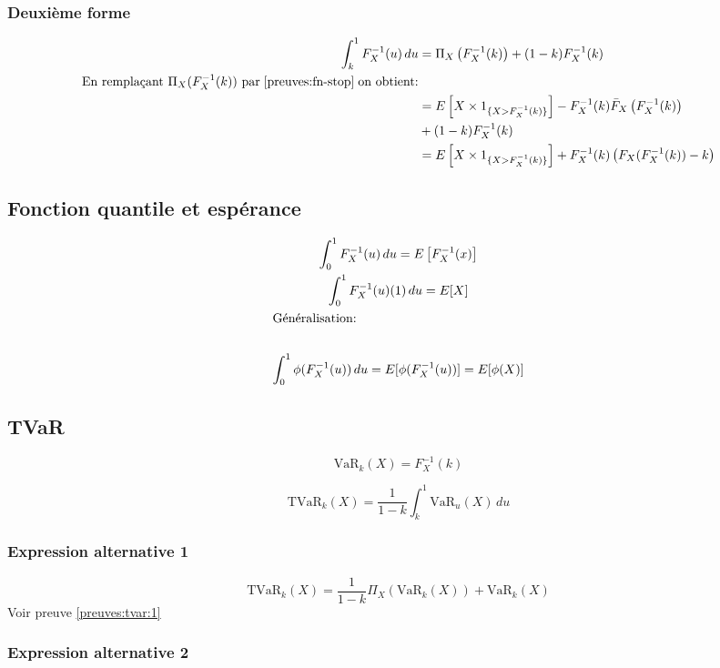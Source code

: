 \subsubsection*{Deuxième forme}\label{intro:fn-quantile:2}

\begin{align*}
\int_k^1 F_X^{-1}(u)\, du& =\Pi_X\left(F_X^{-1}(k)\right)+(1-k)F_X^{-1}(k)\\
\text{En remplaçant $\Pi_X(F_X^{-1}(k))$ par}\; \ref{preuves:fn-stop}\;\text{on obtient:}\\
& =E\left[X \times \mathrm{1}_{\{X > F_X^{-1}(k)\}}\right]-F_X^{-1}(k)\bar{F}_X\left(F_X^{-1}(k)\right)\\ & +(1-k)F_X^{-1}(k)\\
& =E\left[X \times \mathrm{1}_{\{X > F_X^{-1}(k)\}}\right]+F_X^{-1}(k)\left(F_X(F_X^{-1}(k))-k\right)
\end{align*}

\subsection{Fonction quantile et espérance}\label{fn-et-Ex}

\begin{gather*}
\int_0^1 F_X^{-1}(u)\,du =E\left[F_X^{-1}(x)\right]\\
\int_0^1 F_X^{-1} (u)(1)\,du = E[X]\\
\intertext{Généralisation:}\\
\int_0^1 \phi(F_X^{-1}(u))\,du =E[\phi(F_X^{-1}(u))] =E[\phi(X)]
\end{gather*}

\subsection{TVaR}\label{intro:tvar}

\[
\text{VaR}_k(X)= F_X^{-1}(k)
\]

\[
\text{TVaR}_k(X)= \frac{1}{1-k}\int_k^1\text{VaR}_u(X)\,du
\]

\subsubsection*{Expression alternative 1}\label{intro:tvar:alt1}

\[
\text{TVaR}_k(X)= \frac{1}{1-k}\Pi_X\left(\text{VaR}_k(X)\right)+\text{VaR}_k(X)
\] Voir preuve \ref{preuves:tvar:1}

\subsubsection*{Expression alternative 2}\label{intro:tvar:alt2}

